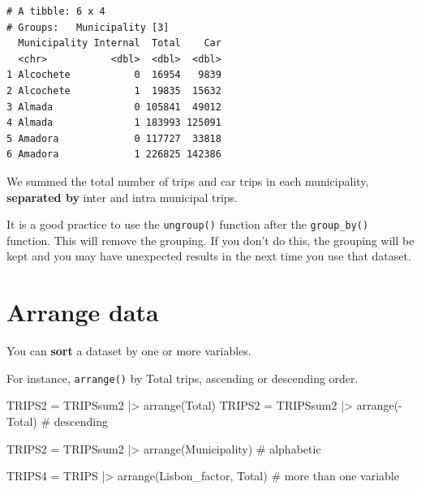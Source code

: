 \documentclass[
  letterpaper,
  DIV=11,
  numbers=noendperiod]{scrreprt}
\newenvironment{Shaded}{\begin{snugshade}}{\end{snugshade}}
\newcommand{\CommentTok}[1]{\textcolor[rgb]{0.37,0.37,0.37}{#1}}
\newcommand{\FunctionTok}[1]{\textcolor[rgb]{0.28,0.35,0.67}{#1}}
\newcommand{\NormalTok}[1]{\textcolor[rgb]{0.00,0.23,0.31}{#1}}
\newcommand{\OtherTok}[1]{\textcolor[rgb]{0.00,0.23,0.31}{#1}}
\newcommand{\SpecialCharTok}[1]{\textcolor[rgb]{0.37,0.37,0.37}{#1}}
\begin{document}
\begin{verbatim}
# A tibble: 6 x 4
# Groups:   Municipality [3]
  Municipality Internal  Total    Car
  <chr>           <dbl>  <dbl>  <dbl>
1 Alcochete           0  16954   9839
2 Alcochete           1  19835  15632
3 Almada              0 105841  49012
4 Almada              1 183993 125091
5 Amadora             0 117727  33818
6 Amadora             1 226825 142386
\end{verbatim}

We summed the total number of trips and car trips in each municipality,
\textbf{separated by} inter and intra municipal trips.

\begin{tcolorbox}[enhanced jigsaw, breakable, left=2mm, colframe=quarto-callout-caution-color-frame, leftrule=.75mm, bottomrule=.15mm, arc=.35mm, rightrule=.15mm, colback=white, opacityback=0, toprule=.15mm]
\begin{minipage}[t]{5.5mm}
\textcolor{quarto-callout-caution-color}{\faFire}
\end{minipage}%
\begin{minipage}[t]{\textwidth - 5.5mm}

It is a good practice to use the \texttt{ungroup()} function after the
\texttt{group\_by()} function. This will remove the grouping. If you
don't do this, the grouping will be kept and you may have unexpected
results in the next time you use that dataset.

\end{minipage}%
\end{tcolorbox}

\section{Arrange data}\label{arrange-data}

You can \textbf{sort} a dataset by one or more variables.

For instance, \texttt{arrange()} by Total trips, ascending or descending
order.

\begin{Shaded}
\begin{Highlighting}[]
\NormalTok{TRIPS2 }\OtherTok{=}\NormalTok{ TRIPSsum2 }\SpecialCharTok{|\textgreater{}} \FunctionTok{arrange}\NormalTok{(Total)}
\NormalTok{TRIPS2 }\OtherTok{=}\NormalTok{ TRIPSsum2 }\SpecialCharTok{|\textgreater{}} \FunctionTok{arrange}\NormalTok{(}\SpecialCharTok{{-}}\NormalTok{Total) }\CommentTok{\# descending}

\NormalTok{TRIPS2 }\OtherTok{=}\NormalTok{ TRIPSsum2 }\SpecialCharTok{|\textgreater{}} \FunctionTok{arrange}\NormalTok{(Municipality) }\CommentTok{\# alphabetic}

\NormalTok{TRIPS4 }\OtherTok{=}\NormalTok{ TRIPS }\SpecialCharTok{|\textgreater{}} \FunctionTok{arrange}\NormalTok{(Lisbon\_factor, Total) }\CommentTok{\# more than one variable}
\end{Highlighting}
\end{Shaded}
\end{document}
